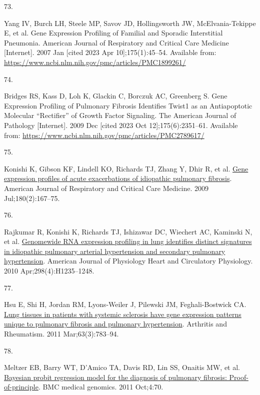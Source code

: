 \documentclass[
]{article}
\newlength{\cslhangindent}
\newlength{\csllabelwidth}
\newenvironment{CSLReferences}[2] %
 {\begin{list}{}{%
  \setlength{\itemindent}{0pt}
  \setlength{\leftmargin}{0pt}
  \setlength{\parsep}{0pt}
  \ifodd #1
   \setlength{\leftmargin}{\cslhangindent}
   \setlength{\itemindent}{-1\cslhangindent}
  \fi
  \setlength{\itemsep}{#2\baselineskip}}}
 {\end{list}}
\newcommand{\CSLLeftMargin}[1]{\parbox[t]{\csllabelwidth}{\strut#1\strut}}
\newcommand{\CSLRightInline}[1]{\parbox[t]{\linewidth - \csllabelwidth}{\strut#1\strut}}
\begin{document}
\begin{CSLReferences}{0}{1}
\CSLLeftMargin{73. }%
\CSLRightInline{Yang IV, Burch LH, Steele MP, Savov JD, Hollingsworth JW, McElvania-Tekippe E, et al. Gene {Expression} {Profiling} of {Familial} and {Sporadic} {Interstitial} {Pneumonia}. American Journal of Respiratory and Critical Care Medicine {[}Internet{]}. 2007 Jan {[}cited 2023 Apr 10{]};175(1):45--54. Available from: \url{https://www.ncbi.nlm.nih.gov/pmc/articles/PMC1899261/}}

\CSLLeftMargin{74. }%
\CSLRightInline{Bridges RS, Kass D, Loh K, Glackin C, Borczuk AC, Greenberg S. Gene {Expression} {Profiling} of {Pulmonary} {Fibrosis} {Identifies} {Twist1} as an {Antiapoptotic} {Molecular} {``{Rectifier}''} of {Growth} {Factor} {Signaling}. The American Journal of Pathology {[}Internet{]}. 2009 Dec {[}cited 2023 Oct 12{]};175(6):2351--61. Available from: \url{https://www.ncbi.nlm.nih.gov/pmc/articles/PMC2789617/}}

\CSLLeftMargin{75. }%
\CSLRightInline{Konishi K, Gibson KF, Lindell KO, Richards TJ, Zhang Y, Dhir R, et al. \href{https://doi.org/10.1164/rccm.200810-1596OC}{Gene expression profiles of acute exacerbations of idiopathic pulmonary fibrosis}. American Journal of Respiratory and Critical Care Medicine. 2009 Jul;180(2):167--75. }

\CSLLeftMargin{76. }%
\CSLRightInline{Rajkumar R, Konishi K, Richards TJ, Ishizawar DC, Wiechert AC, Kaminski N, et al. \href{https://doi.org/10.1152/ajpheart.00254.2009}{Genomewide {RNA} expression profiling in lung identifies distinct signatures in idiopathic pulmonary arterial hypertension and secondary pulmonary hypertension}. American Journal of Physiology Heart and Circulatory Physiology. 2010 Apr;298(4):H1235--1248. }

\CSLLeftMargin{77. }%
\CSLRightInline{Hsu E, Shi H, Jordan RM, Lyons-Weiler J, Pilewski JM, Feghali-Bostwick CA. \href{https://doi.org/10.1002/art.30159}{Lung tissues in patients with systemic sclerosis have gene expression patterns unique to pulmonary fibrosis and pulmonary hypertension}. Arthritis and Rheumatism. 2011 Mar;63(3):783--94. }

\CSLLeftMargin{78. }%
\CSLRightInline{Meltzer EB, Barry WT, D'Amico TA, Davis RD, Lin SS, Onaitis MW, et al. \href{https://doi.org/10.1186/1755-8794-4-70}{Bayesian probit regression model for the diagnosis of pulmonary fibrosis: Proof-of-principle}. BMC medical genomics. 2011 Oct;4:70. }


\end{CSLReferences}
\end{document}
